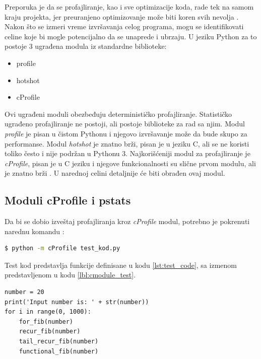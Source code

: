 \documentclass[a4paper]{article}
\begin{document}
Preporuka je da se profajliranje, kao i sve optimizacije koda, rade tek na samom kraju projekta, jer preuranjeno optimizovanje može biti koren svih nevolja \cite{knuth}.
Nakon što se izmeri vreme izvršavanja celog programa, mogu se identifikovati celine koje bi mogle potencijalno da se unaprede i ubrzaju. U jeziku Python za to postoje 3 ugrađena modula iz standardne biblioteke: 
\begin{itemize}
  \item profile
  \item hotshot
  \item cProfile
\end{itemize}
Ovi ugrađeni moduli obezbeđuju determinističko profajliranje. Statističko ugrađeno profajliranje ne postoji, ali postoje biblioteke za rad sa njim. Modul {\em profile} je pisan u čistom Pythonu i njegovo izvršavanje može da bude skupo za performanse. Modul {\em hotshot} je znatno brži, pisan je u jeziku C, ali se ne koristi toliko često i nije podržan u Pythonu 3. Najkorišćeniji modul za profajliranje je {\em cProfile}, pisan je u C jeziku i njegove funkcionalnosti su slične prvom modulu, ali je znatno brži \cite{cProfile}. U narednoj celini detaljnije će biti obrađen ovaj modul.

\subsection{Moduli cProfile i pstats}
Da bi se dobio izveštaj profajliranja kroz {\em cProfile} modul, potrebno je pokrenuti narednu komandu \cite{cProfile}:
\begin{lstlisting}[language=bash, belowskip=-\baselineskip, frame=single, label=lbl:cProfile_komanda]
  $ python -m cProfile test_kod.py
\end{lstlisting}
Test kod predstavlja funkcije definisane u kodu \ref{lst:test_code}, sa izmenom predstavljenom u kodu \ref{lbl:cmodule_test}.
\begin{lstlisting}[caption={Dodatak za testiranje {\em cProfile}},frame=single, 
label=lbl:cmodule_test]
number = 20
print('Input number is: ' + str(number))
for i in range(0, 1000):
    for_fib(number)
    recur_fib(number)
    tail_recur_fib(number)
    functional_fib(number)
\end{lstlisting}
\end{document}
